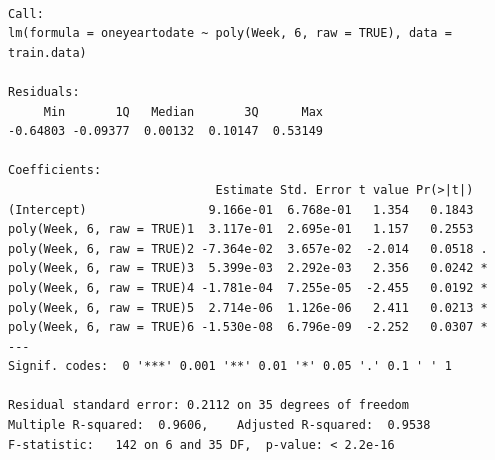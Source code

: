 \documentclass[
  letterpaper,
  DIV=11,
  numbers=noendperiod]{scrreport}
\newenvironment{Shaded}{\begin{snugshade}}{\end{snugshade}}
\newcommand{\AttributeTok}[1]{\textcolor[rgb]{0.40,0.45,0.13}{#1}}
\newcommand{\CommentTok}[1]{\textcolor[rgb]{0.37,0.37,0.37}{#1}}
\newcommand{\ConstantTok}[1]{\textcolor[rgb]{0.56,0.35,0.01}{#1}}
\newcommand{\DecValTok}[1]{\textcolor[rgb]{0.68,0.00,0.00}{#1}}
\newcommand{\FloatTok}[1]{\textcolor[rgb]{0.68,0.00,0.00}{#1}}
\newcommand{\FunctionTok}[1]{\textcolor[rgb]{0.28,0.35,0.67}{#1}}
\newcommand{\NormalTok}[1]{\textcolor[rgb]{0.00,0.23,0.31}{#1}}
\newcommand{\OtherTok}[1]{\textcolor[rgb]{0.00,0.23,0.31}{#1}}
\newcommand{\SpecialCharTok}[1]{\textcolor[rgb]{0.37,0.37,0.37}{#1}}
\begin{document}
\begin{Shaded}
\end{Shaded}

\begin{verbatim}

Call:
lm(formula = oneyeartodate ~ poly(Week, 6, raw = TRUE), data = train.data)

Residuals:
     Min       1Q   Median       3Q      Max 
-0.64803 -0.09377  0.00132  0.10147  0.53149 

Coefficients:
                             Estimate Std. Error t value Pr(>|t|)  
(Intercept)                 9.166e-01  6.768e-01   1.354   0.1843  
poly(Week, 6, raw = TRUE)1  3.117e-01  2.695e-01   1.157   0.2553  
poly(Week, 6, raw = TRUE)2 -7.364e-02  3.657e-02  -2.014   0.0518 .
poly(Week, 6, raw = TRUE)3  5.399e-03  2.292e-03   2.356   0.0242 *
poly(Week, 6, raw = TRUE)4 -1.781e-04  7.255e-05  -2.455   0.0192 *
poly(Week, 6, raw = TRUE)5  2.714e-06  1.126e-06   2.411   0.0213 *
poly(Week, 6, raw = TRUE)6 -1.530e-08  6.796e-09  -2.252   0.0307 *
---
Signif. codes:  0 '***' 0.001 '**' 0.01 '*' 0.05 '.' 0.1 ' ' 1

Residual standard error: 0.2112 on 35 degrees of freedom
Multiple R-squared:  0.9606,    Adjusted R-squared:  0.9538 
F-statistic:   142 on 6 and 35 DF,  p-value: < 2.2e-16
\end{verbatim}
\end{document}
